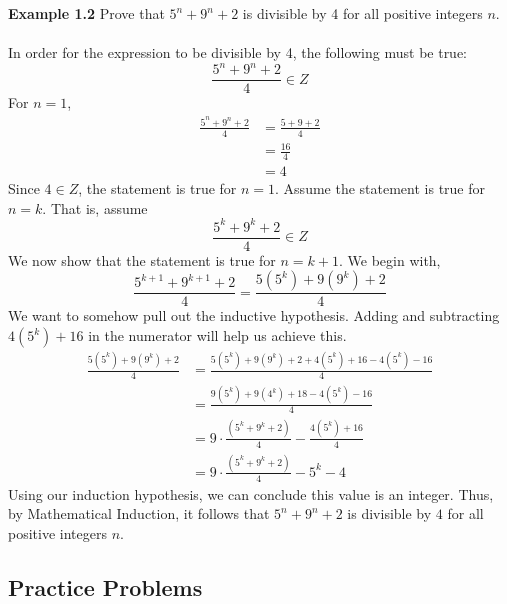 \documentclass{article}
\begin{document}
\noindent \textbf{Example 1.2} Prove that $5^n + 9^n + 2$ is divisible by 4 for all positive integers $n$. \\\\ 
In order for the expression to be divisible by 4, the following must be true:
\newline
$$\frac{5^n + 9^n + 2}{4} \in Z$$
For $n = 1$,
\begin{align*}
    \frac{5^n + 9^n + 2}{4} & = \frac{5 + 9 + 2}{4} \\
    & = \frac{16}{4} \\ & = 4
\end{align*}
Since $4 \in Z$, the statement is true for $n = 1$. Assume the statement is true for $n = k$. That is, assume
$$\frac{5^k + 9^k + 2}{4} \in Z$$
We now show that the statement is true for $n = k + 1$. We begin with,
$$\frac{5^{k+1} + 9^{k+1} + 2}{4} = \frac{5(5^k)+9(9^k)+2}{4}$$
We want to somehow pull out the inductive hypothesis. Adding and subtracting $4(5^k) + 16$ in the numerator will help us achieve this.
\begin{align*}
   \frac{5(5^k)+9(9^k)+2}{4} & = \frac{5(5^k)+9(9^k)+2+4(5^k)+16-4(5^k)-16}{4} \\
   & = \frac{9(5^k)+9(4^k)+18-4(5^k)-16}{4} \\
   &= 9\cdot\frac{(5^k + 9^k + 2)}{4} - \frac{4(5^k)+16}{4} \\
   &= 9\cdot\frac{(5^k + 9^k + 2)}{4} - 5^k - 4
\end{align*}
Using our induction hypothesis, we can conclude this value is an integer. Thus, by Mathematical Induction, it follows that $5^n + 9^n + 2$ is divisible by $4$ for all positive integers $n$.

\bigskip

\subsection{Practice Problems}
\end{document}
